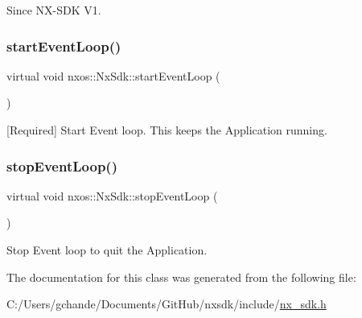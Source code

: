 \begin{DoxySince}{Since}
N\+X-\/\+S\+DK V1. 
\end{DoxySince}
\mbox{\label{classnxos_1_1_nx_sdk_a75ca70643fe325ddf0eea62c1f8c4cc8}} 
\subsubsection{\texorpdfstring{start\+Event\+Loop()}{startEventLoop()}}
{\footnotesize\ttfamily virtual void nxos\+::\+Nx\+Sdk\+::start\+Event\+Loop (\begin{DoxyParamCaption}{ }\end{DoxyParamCaption})\hspace{0.3cm}{\ttfamily [pure virtual]}}

\mbox{[}Required\mbox{]} Start Event loop. This keeps the Application running. \mbox{\label{classnxos_1_1_nx_sdk_adc80e6f244a7cbc050f9dacbc8018315}} 
\subsubsection{\texorpdfstring{stop\+Event\+Loop()}{stopEventLoop()}}
{\footnotesize\ttfamily virtual void nxos\+::\+Nx\+Sdk\+::stop\+Event\+Loop (\begin{DoxyParamCaption}{ }\end{DoxyParamCaption})\hspace{0.3cm}{\ttfamily [pure virtual]}}

Stop Event loop to quit the Application. 

The documentation for this class was generated from the following file\+:\begin{DoxyCompactItemize}
\item 
C\+:/\+Users/gchande/\+Documents/\+Git\+Hub/nxsdk/include/\mbox{\hyperlink{nx__sdk_8h}{nx\+\_\+sdk.\+h}}\end{DoxyCompactItemize}
